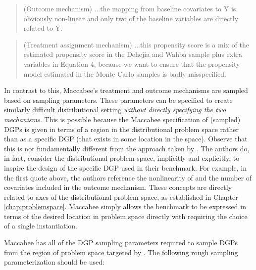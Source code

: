 \documentclass[../main.tex]{subfiles}
\begin{document}
\begin{quote}
    (Outcome mechanism) ...the mapping from baseline covariates to Y is obviously non-linear and only two of the baseline variables are directly related to Y.
\end{quote}

\begin{quote}
    (Treatment assignment mechanism) ...this propensity score is a mix of the estimated propensity score in the Dehejia and Wahba sample plus extra variables in Equation 4, because we want to ensure that the propensity model estimated in the Monte Carlo samples is badly misspecified.
\end{quote}

In contrast to this, Maccabee's treatment and outcome mechanisms are sampled based on sampling parameters. These parameters can be specified to create similarly difficult distributional setting \textit{without directly specifying the two mechanisms}. This is possible because the Maccabee specification of (sampled) DGPs is given in terms of a region in the distributional problem space rather than as a specific DGP (that exists in some location in the space). Observe that this is not fundamentally different from the approach taken by \citeauthor{Diamond2013GeneticStudies}. The authors do, in fact, consider the distributional problem space, implicitly and explicitly, to inspire the design of the specific DGP used in their benchmark. For example, in the first quote above, the authors reference the nonlinearity of and the number of covariates included in the outcome mechanism. These concepts are directly related to axes of the distributional problem space, as established in Chapter \ref{chap:problemspace}. Maccabee simply allows the benchmark to be expressed in terms of the desired location in problem space directly with requiring the choice of a single instantiation.

\vspace{\baselineskip}

Maccabee has all of the DGP sampling parameters required to sample DGPs from the region of problem space targeted by \textcite{Diamond2013GeneticStudies}. The following rough sampling parameterization should be used:
\end{document}
